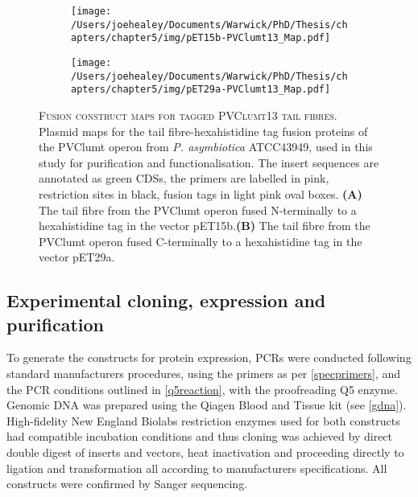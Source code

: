\begin{figure}[p]
\centering
    \begin{subfigure}{\textwidth}
        \centering
        \texttt{[image: /Users/joehealey/Documents/Warwick/PhD/Thesis/chapters/chapter5/img/pET15b-PVClumt13\_Map.pdf]}
        \captionsetup{singlelinecheck=off, justification=centering, font=footnotesize, aboveskip=10pt}
        \caption{}
        \label{pET15lumt}
    \end{subfigure}%
    
    \begin{subfigure}{\textwidth}
        \centering
            \texttt{[image: /Users/joehealey/Documents/Warwick/PhD/Thesis/chapters/chapter5/img/pET29a-PVClumt13\_Map.pdf]}
            \captionsetup{singlelinecheck=off, justification=centering, font=footnotesize, aboveskip=10pt}
            \caption{}
            \label{pET29lumt}
        \end{subfigure}%
	\captionsetup{singlelinecheck=off, justification=justified, font=footnotesize, aboveskip=10pt}
	\caption[Plasmid maps for cloned PVClumt tail fibre proteins]{\textsc{\normalsize Fusion construct maps for tagged PVClumt13 tail fibres.}\vspace{0.1cm} \newline Plasmid maps for the tail fibre-hexahistidine tag fusion proteins of the PVClumt operon from \emph{P. asymbiotica} ATCC43949, used in this study for purification and functionalisation. The insert sequences are annotated as green CDSs, the primers are labelled in pink, restriction sites in black, fusion tags in light pink oval boxes. \textbf{(A)} The tail fibre from the PVClumt operon fused N-terminally to a hexahistidine tag in the vector pET15b.\textbf{(B)} The tail fibre from the PVClumt operon fused C-terminally to a hexahistidine tag in the vector pET29a.}
	\label{tailfibreplasmids}
\end{figure}
\clearpage




\subsection{Experimental cloning, expression and purification}
To generate the constructs for protein expression, PCRs were conducted following standard manufacturers procedures, using the primers as per \vref{specprimers}, and the PCR conditions outlined in \vref{q5reaction}, with the proofreading Q5 enzyme. Genomic DNA was prepared using the Qiagen Blood and Tissue kit (see \vref{gdna}). High-fidelity New England Biolabs restriction enzymes used for both constructs had compatible incubation conditions and thus cloning was achieved by direct double digest of inserts and vectors, heat inactivation and proceeding directly to ligation and transformation all according to manufacturers specifications. All constructs were confirmed by Sanger sequencing.

